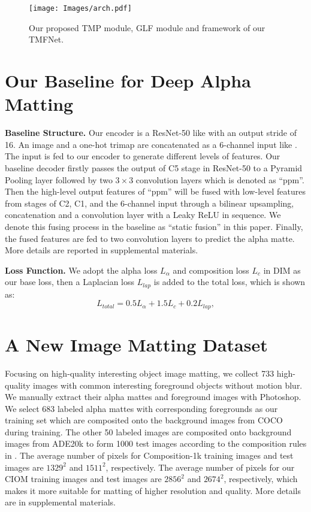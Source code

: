 \documentclass[10pt,twocolumn,letterpaper]{article}
\begin{document}
\begin{figure*}[t]
  \centering
  \texttt{[image: Images/arch.pdf]}
  \caption{Our proposed TMP module, GLF module and framework of our TMFNet.}
  \label{fig:fra}
\end{figure*}

\section{Our Baseline for Deep Alpha Matting}
\textbf{Baseline Structure.} Our encoder is a ResNet-50 \cite{resnet} like \cite{sim} with an output stride of 16. An image and a one-hot trimap are concatenated as a 6-channel input like \cite{gca}. The input is fed to our encoder to generate different levels of features. Our baseline decoder firstly passes the output of C5 stage in ResNet-50 to a Pyramid Pooling layer \cite{psp} followed by two $3\times 3$ convolution layers  which is denoted as ``ppm''. Then the high-level output features of ``ppm'' will be fused with low-level features from stages of C2, C1, and the 6-channel input through a bilinear upsampling, concatenation and a convolution layer with a Leaky ReLU \cite{leaky} in sequence. We denote this fusing process in the baseline as ``static fusion'' in this paper. Finally, the fused features are fed to two convolution layers to predict the alpha matte. More details are reported in supplemental materials.

\textbf{Loss Function.} We adopt the alpha loss $L_{\alpha}$ and composition loss $L_{c}$ in DIM \cite{deepmatting} as our base loss, then a Laplacian loss $L_{lap}$  \cite{context} is added to the total loss, which is shown as:
\begin{equation}
	L_{total} = 0.5L_{\alpha} + 1.5L_{c} +0.2L_{lap},
	\label{loss}
\end{equation}



\section{A New Image Matting Dataset}
Focusing on high-quality interesting object image matting, we collect 733 high-quality images with common interesting foreground objects without motion blur. We manually  extract their alpha
mattes and foreground images with Photoshop. We select 683 labeled alpha mattes with corresponding foregrounds as our training set which are composited onto the background images from COCO \cite{coco} during training. The other 50 labeled images are composited onto background images from ADE20k \cite{ade} to form 1000 test images according to the composition rules in \cite{deepmatting}. The average number of pixels for Composition-1k  \cite{deepmatting} training images and test images are $1329^2$ and $1511^2$, respectively. The average number of pixels for our CIOM training images and test images are $2856^2$ and $2674^2$, respectively, which makes it more suitable for matting of higher resolution and quality. More details are in supplemental materials. 
\end{document}
